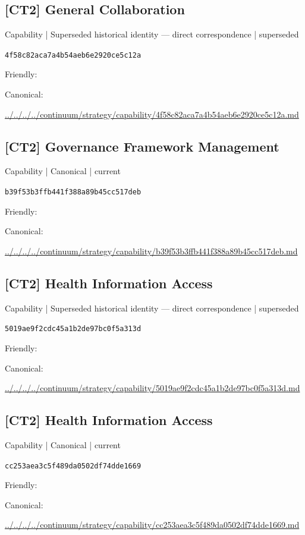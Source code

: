 \documentclass[10pt,a4paper]{article}
\begin{document}
\subsection*{[CT2] General Collaboration}
{\small Capability | Superseded historical identity — direct correspondence | superseded}\par
\texttt{4f58c82aca7a4b54aeb6e2920ce5c12a}\par
Friendly: \par
Canonical: \par
{\footnotesize\url{../../../../continuum/strategy/capability/4f58c82aca7a4b54aeb6e2920ce5c12a.md}}\par
\subsection*{[CT2] Governance Framework Management}
{\small Capability | Canonical | current}\par
\texttt{b39f53b3ffb441f388a89b45cc517deb}\par
Friendly: \par
Canonical: \par
{\footnotesize\url{../../../../continuum/strategy/capability/b39f53b3ffb441f388a89b45cc517deb.md}}\par
\subsection*{[CT2] Health Information Access}
{\small Capability | Superseded historical identity — direct correspondence | superseded}\par
\texttt{5019ae9f2cdc45a1b2de97bc0f5a313d}\par
Friendly: \par
Canonical: \par
{\footnotesize\url{../../../../continuum/strategy/capability/5019ae9f2cdc45a1b2de97bc0f5a313d.md}}\par
\subsection*{[CT2] Health Information Access}
{\small Capability | Canonical | current}\par
\texttt{cc253aea3c5f489da0502df74dde1669}\par
Friendly: \par
Canonical: \par
{\footnotesize\url{../../../../continuum/strategy/capability/cc253aea3c5f489da0502df74dde1669.md}}\par
\end{document}
